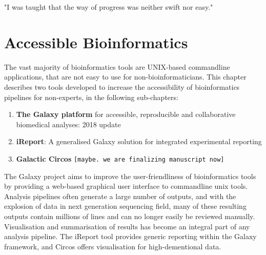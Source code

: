 \begin{savequote}[75mm]
"I was taught that the way of progress was neither swift nor easy."
\end{savequote}

\chapter{Accessible Bioinformatics}\label{chapter:general}
\setcounter{figure}{-1}
\setcounter{table}{-1}
\setcounter{section}{-1}
\setcounter{NAT@ctr}{-1}

\begin{comment}
iReport, Circos?, myFAIR?, Galaxy2018update? (I am co-author and technically everybody is
shared first on that? would fit nicely with the overall story as every other paper connects
to Galaxy.)
- Training paper in its own section or add it here?
\end{comment}

The vast majority of bioinformatics tools are UNIX-based commandline applications, that are not easy to use for non-bioinformaticians. This chapter describes two tools developed to increase the accessibility of bioinformatics pipelines for non-experts, in the following sub-chapters:

\begin{enumerate}
\itemsep-0.5em
\item \textbf{The Galaxy platform} for accessible, reproducible and collaborative biomedical analyses: 2018 update
\item \textbf{iReport}: A generalised Galaxy solution for integrated experimental reporting
\item \textbf{Galactic Circos} \verb+[maybe. we are finalizing manuscript now]+
\end{enumerate}

The Galaxy project aims to improve the user-friendliness of bioinformatics tools by providing a web-based graphical user interface to commandline unix tools. Analysis pipelines often generate a large number of outputs, and with the explosion of data in next generation sequencing field, many of these resulting outputs contain millions of lines and can no longer easily be reviewed manually. Visualisation and summarisation of results has become an integral part of any analysis pipeline. The iReport tool provides generic reporting within the Galaxy framework, and Circos offers visualisation for high-dementional data.

\begin{comment}
Contents of this chapter:
\begin{enumerate}
\itemsep-0.5em
\item The Galaxy platform for accessible, reprodu- cible and collaborative biomedical analyses: 2018 update
\item iReport: A generalised Galaxy solution for integrated experimental reporting
\item Galactic Circos: Visualisation of high-dimensional data in Galaxy
\end{enumerate}
\end{comment}
